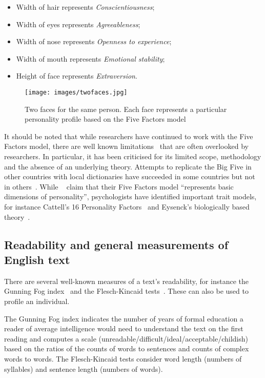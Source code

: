\documentclass[letterpaper]{article}
\begin{document}
\begin{itemize}
\item Width of hair represents {\emph{Conscientiousness}}; 
\item Width of eyes represents {\emph{Agreeableness}};
\item Width of nose represents {\emph{Openness to experience}}; 
\item Width of mouth represents {\emph{Emotional stability}};
\item Height of face represents {\emph{Extraversion}}.
\end{itemize}

\begin{figure}[!htb]
\centering
\texttt{[image: images/twofaces.jpg]}
\caption{Two faces for the same person. Each face represents a particular personality profile based on the Five Factors model}
\label{fig:twofaces}
\end{figure}

It should be noted that while researchers have continued to work with
the Five Factors model, there are well known
limitations~\cite{eysenck:1992,paunonen+jackson:2000,block:2010} that
are often overlooked by researchers. In particular, it has been
criticised for its limited scope, methodology and the absence of an
underlying theory. Attempts to replicate the Big Five in other
countries with local dictionaries have succeeded in some countries but
not in others~\cite{szirmak+deraad:1994,defruyt-et-al:2004}. While
\citeauthor{costa+mccrae:1992}~ claim
that their Five Factors model ``represents basic dimensions of
personality'', psychologists have identified important trait models,
for instance Cattell's 16 Personality Factors~\cite{cattell:1946} and
Eysenck's biologically based theory~\cite{eysenck:1947}.


\subsection{Readability and general measurements of English text}

There are several well-known measures of a text's readability, for
instance the Gunning Fog index~\cite{gunning:1968} and the
Flesch-Kincaid tests~\cite{kincaid-et-al:1975}. These can also be used
to profile an individual.

The Gunning Fog index indicates the number of years of formal
education a reader of average intelligence would need to understand
the text on the first reading and computes a scale
(unreadable/difficult/ideal/acceptable/childish) based on the ratios
of the counts of words to sentences and counts of complex words to
words. The Flesch-Kincaid tests consider word length (numbers of
syllables) and sentence length (numbers of words).
\end{document}
